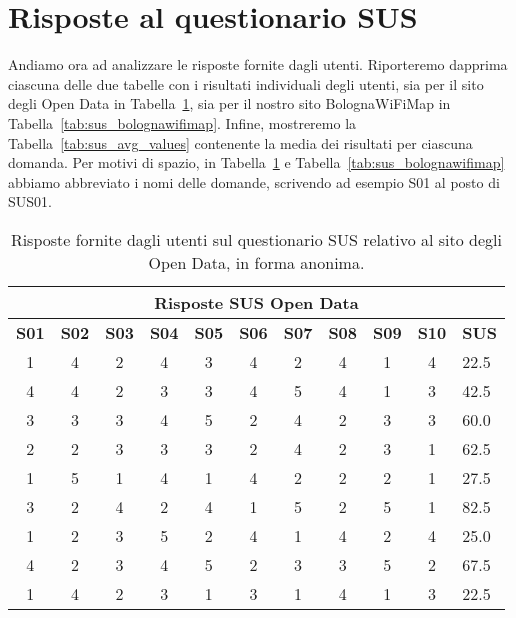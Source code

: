 \section{Risposte al questionario SUS}
Andiamo ora ad analizzare le risposte fornite dagli utenti. Riporteremo dapprima ciascuna delle due tabelle con i risultati individuali degli utenti, sia per il sito degli Open Data in Tabella~\ref{tab:sus_opendata}, sia per il nostro sito BolognaWiFiMap in Tabella~\ref{tab:sus_bolognawifimap}. Infine, mostreremo la Tabella~\ref{tab:sus_avg_values} contenente la media dei risultati per ciascuna domanda. Per motivi di spazio, in Tabella~\ref{tab:sus_opendata} e Tabella~\ref{tab:sus_bolognawifimap} abbiamo abbreviato i nomi delle domande, scrivendo ad esempio S01 al posto di SUS01.

\begin{center}
    \begin{table}[H]
        \centering
        \begin{tabularx}{\textwidth}{|c|c|c|c|c|c|c|c|c|c|X|}
            \hline
            \multicolumn{11}{|c|}{\textbf{Risposte SUS Open Data}} \\
            \hline
            \textbf{S01} & \textbf{S02} & \textbf{S03} & \textbf{S04} & \textbf{S05} & \textbf{S06} & \textbf{S07} & \textbf{S08} & \textbf{S09} & \textbf{S10} & \textbf{SUS} \\
            \hline
            1 & 4 & 2 & 4 & 3 & 4 & 2 & 4 & 1 & 4 & 22.5 \\
            4 & 4 & 2 & 3 & 3 & 4 & 5 & 4 & 1 & 3 & 42.5 \\
            3 & 3 & 3 & 4 & 5 & 2 & 4 & 2 & 3 & 3 & 60.0 \\
            2 & 2 & 3 & 3 & 3 & 2 & 4 & 2 & 3 & 1 & 62.5 \\
            1 & 5 & 1 & 4 & 1 & 4 & 2 & 2 & 2 & 1 & 27.5 \\
            3 & 2 & 4 & 2 & 4 & 1 & 5 & 2 & 5 & 1 & 82.5 \\
            1 & 2 & 3 & 5 & 2 & 4 & 1 & 4 & 2 & 4 & 25.0 \\
            4 & 2 & 3 & 4 & 5 & 2 & 3 & 3 & 5 & 2 & 67.5 \\
            1 & 4 & 2 & 3 & 1 & 3 & 1 & 4 & 1 & 3 & 22.5 \\
            \hline
        \end{tabularx}
        \caption[Risposte del questionario SUS sul sito degli Open Data]{Risposte fornite dagli utenti sul questionario SUS relativo al sito degli Open Data, in forma anonima.}
        \label{tab:sus_opendata}
    \end{table}
\end{center}

